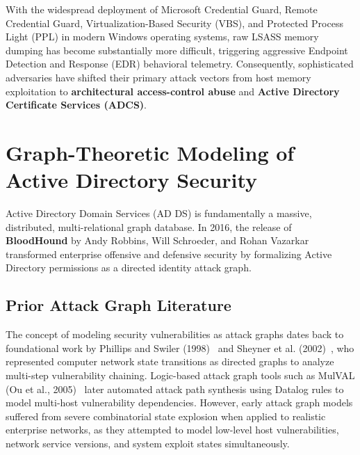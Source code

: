 With the widespread deployment of Microsoft Credential Guard, Remote Credential Guard, Virtualization-Based Security (VBS), and Protected Process Light (PPL) in modern Windows operating systems, raw LSASS memory dumping has become substantially more difficult, triggering aggressive Endpoint Detection and Response (EDR) behavioral telemetry. Consequently, sophisticated adversaries have shifted their primary attack vectors from host memory exploitation to \textbf{architectural access-control abuse} and \textbf{Active Directory Certificate Services (ADCS)}.

\section{Graph-Theoretic Modeling of Active Directory Security}
Active Directory Domain Services (AD DS) is fundamentally a massive, distributed, multi-relational graph database. In 2016, the release of \textbf{BloodHound} by Andy Robbins, Will Schroeder, and Rohan Vazarkar~\cite{robbins2017bloodhound} transformed enterprise offensive and defensive security by formalizing Active Directory permissions as a directed identity attack graph.

\subsection{Prior Attack Graph Literature}
The concept of modeling security vulnerabilities as attack graphs dates back to foundational work by Phillips and Swiler (1998)~\cite{phillips1998graph} and Sheyner et al. (2002)~\cite{sheyner2002automated}, who represented computer network state transitions as directed graphs to analyze multi-step vulnerability chaining. Logic-based attack graph tools such as MulVAL (Ou et al., 2005)~\cite{ou2005mulval} later automated attack path synthesis using Datalog rules to model multi-host vulnerability dependencies. However, early attack graph models suffered from severe combinatorial state explosion when applied to realistic enterprise networks, as they attempted to model low-level host vulnerabilities, network service versions, and system exploit states simultaneously.

